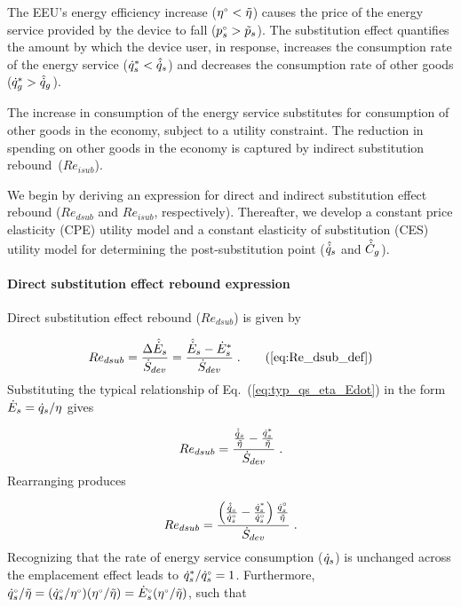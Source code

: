 The EEU's energy efficiency increase
(${}{\eta}^{\scriptscriptstyle \circ} < \tilde{\eta}$)
causes the price of the energy service provided by the device to fall
(${}{p}^{\scriptscriptstyle \circ}_s > \tilde{p}_s$).
The substitution effect quantifies the amount by which
the device user, in response,
increases the consumption rate of the energy service 
(${\dot{q}}^*_s < \hat{\dot{q}}_s$) 
and decreases the consumption rate of other goods 
(${\dot{q}}^*_g > \hat{\dot{q}}_g$).

The increase in consumption of the energy service 
substitutes for consumption of other goods in the economy,
subject to a utility constraint.
The reduction in spending on other goods in the economy
is captured by indirect substitution rebound~($Re_{isub}$).

We begin by deriving an expression for direct and indirect 
substitution effect rebound ($Re_{dsub}$ and $Re_{isub}$, respectively).
Thereafter, we develop 
a constant price elasticity (CPE) utility model and
a constant elasticity of substitution (CES) utility model
for determining the 
post-substitution point ($\hat{\dot{q}}_s$ and $\hat{\dot{C}}_g$).


\paragraph{Direct substitution effect rebound expression}
\label{sec:Redsub_expression}

Direct substitution effect rebound ($Re_{dsub}$) is given by

\begin{equation}
  Re_{dsub} = \frac{\Delta \rasub{E}_s}{\Sdot} = \frac{\rasub{E}_s - \rbsub{E}_s}{\Sdot} \; . \tag{\ref{eq:Re_dsub_def}}
\end{equation}
%
Substituting the typical relationship of Eq.~(\ref{eq:typ_qs_eta_Edot})
in the form $\dot{E}_s = \dot{q}_s/\eta$ gives

\begin{equation}
  Re_{dsub} = \frac{\frac{\hat{\dot{q}}_s}{\tilde{\eta}} - \frac{{\dot{q}}^*_s}{\tilde{\eta}}}{\dot{S}_{dev}} \; .
\end{equation}
%
Rearranging produces

\begin{equation}
  Re_{dsub} = \frac{ \left( \frac{\hat{\dot{q}}_s}{{}{\dot{q}}^{\scriptscriptstyle \circ}_s}
                    - \frac{{\dot{q}}^*_s}{{}{\dot{q}}^{\scriptscriptstyle \circ}_s}  \right) \frac{{}{\dot{q}}^{\scriptscriptstyle \circ}_s}{\tilde{\eta}} }{\dot{S}_{dev}} \; .
\end{equation}
%
Recognizing that the rate of energy service consumption ($\dot{q}_s$)
is unchanged across the emplacement effect leads to ${\dot{q}}^*_s/{}{\dot{q}}^{\scriptscriptstyle \circ}_s = 1$.
Furthermore, ${}{\dot{q}}^{\scriptscriptstyle \circ}_s/\tilde{\eta}
            = ({}{\dot{q}}^{\scriptscriptstyle \circ}_s/{}{\eta}^{\scriptscriptstyle \circ}) ({}{\eta}^{\scriptscriptstyle \circ}/\tilde{\eta})
            = {}{\dot{E}}^{\scriptscriptstyle \circ}_s ({}{\eta}^{\scriptscriptstyle \circ}/\tilde{\eta})$,
such that

